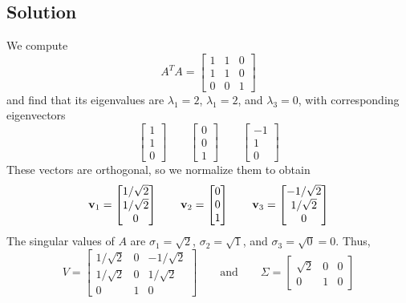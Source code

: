 \subsection*{Solution}
We compute
\[A^TA=\begin{bmatrix}
        1 & 1 & 0 \\
        1 & 1 & 0 \\
        0 & 0 & 1
    \end{bmatrix}\]
and find that its eigenvalues are $\lambda_1=2$, $\lambda_1=2$, and $\lambda_3=0$,
with corresponding eigenvectors
\[\begin{bmatrix}
        1 \\1\\0
    \end{bmatrix}\qquad\begin{bmatrix}
        0 \\0\\1
    \end{bmatrix}\qquad\begin{bmatrix}
        -1 \\1\\0
    \end{bmatrix}\]
These vectors are orthogonal, so we normalize them to obtain
\[\mathbf{v}_1=\begin{bmatrix}
        1/\sqrt{2} \\
        1/\sqrt{2} \\
        {0}
    \end{bmatrix}\qquad\mathbf{v}_2=\begin{bmatrix}
        0 \\
        0 \\
        1
    \end{bmatrix}\qquad\mathbf{v}_3=\begin{bmatrix}
        -1/\sqrt{2} \\
        1/\sqrt{2}  \\
        {0}
    \end{bmatrix}\]
The singular values of $A$ are $\sigma_1=\sqrt{2}$, $\sigma_2=\sqrt{1}$, and
$\sigma_3=\sqrt{0}=0$. Thus,
\[V=\begin{bmatrix}
        1/\sqrt{2} & 0 & -1/\sqrt{2} \\
        1/\sqrt{2} & 0 & 1/\sqrt{2}  \\
        0          & 1 & 0
    \end{bmatrix}\qquad \text{and} \qquad \Sigma=\begin{bmatrix}
        \sqrt{2} & 0 & 0 \\
        0        & 1 & 0
    \end{bmatrix}\]

